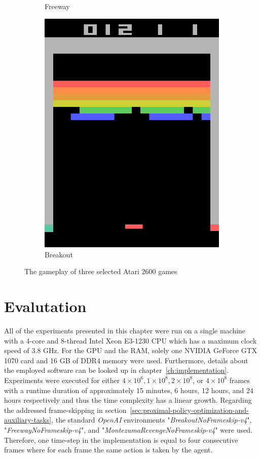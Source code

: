 \documentclass[draft,final]{vutinfth} %
\begin{document}
\begin{figure}[h]
\begin{center}
\begin{subfigure}{.3\textwidth}
                \caption{Freeway}
                \label{fig:fway}
            \end{subfigure}
            \begin{subfigure}{.3\textwidth}
                \centering
                \includegraphics[width=.8\linewidth]{figures/breakout.png}
                \caption{Breakout}
                \label{fig:break}
            \end{subfigure} \caption{The gameplay of three selected Atari 2600 games}
            \label{fig:games}
        \end{center}
    \end{figure}


    \section{Evalutation}
    All of the experiments presented in this chapter were run on a single machine with a 4-core and 8-thread Intel Xeon E3-1230 CPU which has a maximum clock speed of 3.8 GHz.
    For the GPU and the RAM, solely one NVIDIA GeForce GTX 1070 card and 16 GB of DDR4 memory were used.
    Furthermore, details about the employed software can be looked up in chapter~\ref{ch:implementation}.
    Experiments were executed for either $4 \times 10^6, 1 \times 10^8, 2 \times 10^8$, or $4 \times 10^8$ frames with a runtime duration of approximately 15 minutes, 6 hours, 12 hours, and 24 hours respectively and thus the time complexity has a linear growth.
    Regarding the addressed frame-skipping in section~\ref{sec:proximal-policy-optimization-and-auxiliary-tasks}, the standard \textit{OpenAI} environments "\textit{BreakoutNoFrameskip-v4}", "\textit{FreewayNoFrameskip-v4}", and "\textit{MontezumaRevengeNoFrameskip-v4}" were used.
    Therefore, one time-step in the implementation is equal to four consecutive frames where for each frame the same action is taken by the agent.
\end{document}

